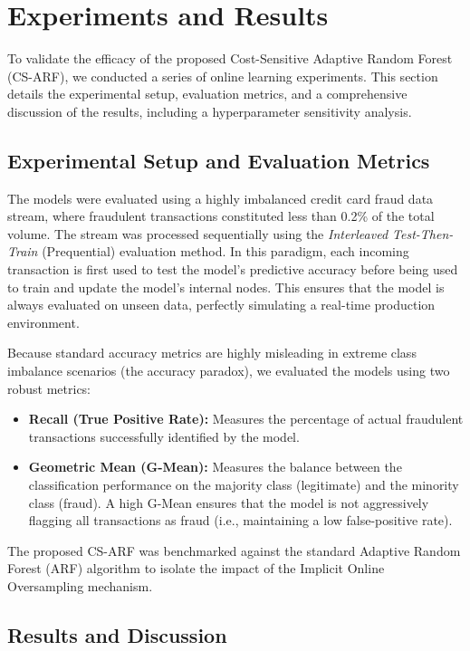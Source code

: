 \section{Experiments and Results}
\label{sec:experiments}

To validate the efficacy of the proposed Cost-Sensitive Adaptive Random Forest (CS-ARF), we conducted a series of online learning experiments. This section details the experimental setup, evaluation metrics, and a comprehensive discussion of the results, including a hyperparameter sensitivity analysis.

\subsection{Experimental Setup and Evaluation Metrics}
The models were evaluated using a highly imbalanced credit card fraud data stream, where fraudulent transactions constituted less than 0.2\% of the total volume. The stream was processed sequentially using the \textit{Interleaved Test-Then-Train} (Prequential) evaluation method. In this paradigm, each incoming transaction is first used to test the model's predictive accuracy before being used to train and update the model's internal nodes. This ensures that the model is always evaluated on unseen data, perfectly simulating a real-time production environment.

Because standard accuracy metrics are highly misleading in extreme class imbalance scenarios (the accuracy paradox), we evaluated the models using two robust metrics:
\begin{itemize}
    \item \textbf{Recall (True Positive Rate):} Measures the percentage of actual fraudulent transactions successfully identified by the model.
    \item \textbf{Geometric Mean (G-Mean):} Measures the balance between the classification performance on the majority class (legitimate) and the minority class (fraud). A high G-Mean ensures that the model is not aggressively flagging all transactions as fraud (i.e., maintaining a low false-positive rate).
\end{itemize}

The proposed CS-ARF was benchmarked against the standard Adaptive Random Forest (ARF) algorithm to isolate the impact of the Implicit Online Oversampling mechanism.

\subsection{Results and Discussion}

